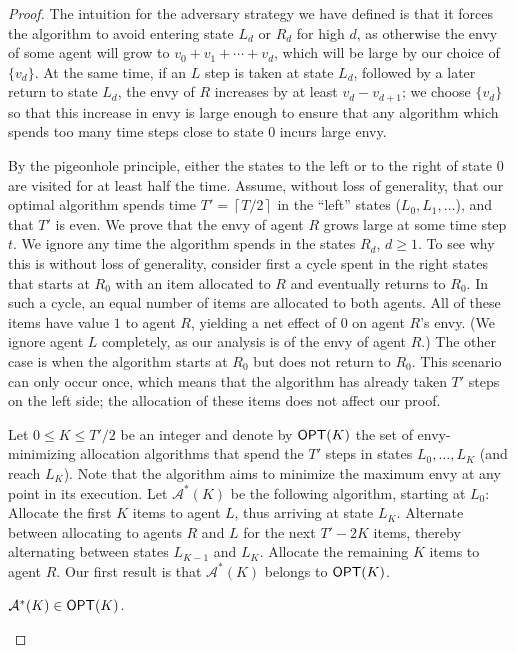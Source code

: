 \begin{proof}
The intuition for the adversary strategy we have defined is that it forces the algorithm to avoid entering state $L_d$ or $R_d$ for high $d$, as otherwise the envy of some agent will grow to $v_0 + v_1 + \cdots + v_d$, which will be large by our choice of $\{v_d\}$. At the same time, if an $L$ step is taken at state $L_d$, followed by a later return to state $L_d$, the envy of $R$ increases by at least $v_d-v_{d+1}$; we choose $\{v_d\}$ so that this increase in envy is large enough to ensure that any algorithm which spends too many time steps close to state $0$ incurs large envy.



By the pigeonhole principle, either the states to the left or to the right of state $0$ are visited for at least half the time.
Assume, without loss of generality, that our optimal algorithm spends time $T' = \left\lceil{T/2}\right\rceil$ in the ``left'' states ($L_0, L_1,\ldots$), and that $T'$ is even.
We prove that the envy of agent $R$ grows large at some time step $t$.
We ignore any time the algorithm spends in the states $R_d$, $d \ge 1$.
To see why this is without loss of generality, consider first a cycle spent in the right states that starts at $R_0$ with an item allocated to $R$ and eventually returns to $R_0$.
In such a cycle, an equal number of items are allocated to both agents.
All of these items have value $1$ to agent $R$, yielding a net effect of $0$ on agent $R$'s envy. ({We ignore agent $L$ completely, as our analysis is of the envy of agent $R$.}) The other case is when the algorithm starts at $R_0$ but does not return to $R_0$. This scenario can only occur once, which means that the algorithm has already taken $T'$ steps on the left side; the allocation of these items does not affect our proof.

Let  $0 \leq K \leq T'/2$ be an integer and denote by $\mathsf{OPT}(K)$ the set of envy-minimizing allocation algorithms that spend the $T'$ steps in states $L_0, \ldots, L_{K}$ (and reach $L_K$). Note that the algorithm aims to minimize the maximum envy at any point in its execution. 
Let $\mathcal{A}^*(K)$ be the following algorithm, starting at $L_0$:
Allocate the first $K$ items to agent $L$, thus arriving at state $L_{K}$.
Alternate between allocating to agents $R$ and $L$ for the next $T'-2K$ items, thereby alternating between states $L_{K-1}$ and $L_{K}$.
Allocate the remaining $K$ items to agent $R$. Our first result is that $\mathcal{A}^*(K)$ belongs to $\mathsf{OPT}(K)$.

\begin{lemma}\label{lem:lb:A*opt}
	$\mathcal{A}^*(K) \in \mathsf{OPT}(K)$.
\end{lemma}
 

\end{proof}
